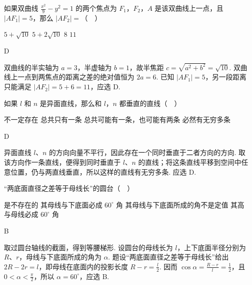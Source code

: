 \documentclass[UTF8,a4paper,oneside,11pt]{ctexbook}
\begin{document}
\begin{problem}
如果双曲线 \(\frac{x^2}{9}-y^2=1\) 的两个焦点为 \(F_1\)，\(F_2\)，\(A\) 是该双曲线上一点，且 \(\left| AF_1 \right|=5\)，那么 \(\left| AF_2 \right|=\)（\(\quad\)）

\choices
    {\(5+\sqrt{10}\)}
    {\(5+2\sqrt{10}\)}
    {\(8\)}
    {\(11\)}
\end{problem}

\begin{answer}
D
\end{answer}

\begin{solution}
双曲线的半实轴为 \(a=3\)，半虚轴为 \(b=1\)，故半焦距 \(c=\sqrt{a^2+b^2}=\sqrt{10}\). 双曲线上一点到两焦点的距离之差的绝对值恒为 \(2a=6\). 已知 \(\lvert AF_1\rvert=5\)，另一段距离只能满足 \(\lvert AF_2\rvert=5+6=11\)，应选 D.
\end{solution}

\begin{problem}
如果 \(l\) 和 \(n\) 是异面直线，那么和 \(l\)，\(n\) 都垂直的直线（\(\quad\)）

\choices
    {不一定存在}
    {总共只有一条}
    {总共可能有一条，也可能有两条}
    {必然有无穷多条}
\end{problem}

\begin{answer}
D
\end{answer}

\begin{solution}
异面直线 \(l\)、\(n\) 的方向向量不平行，因此存在一个同时垂直于二者方向的方向. 取该方向作一条直线，便得到同时垂直于 \(l\)、\(n\) 的直线；将这条直线平移到空间中任意位置，仍与两直线垂直，所以这样的直线有无穷多条. 应选 D.
\end{solution}

\begin{problem}
“两底面直径之差等于母线长”的圆台（\(\quad\)）

\choices
    {是不存在的}
    {其母线与下底面必成 \(60^\circ\) 角}
    {其母线与下底面所成的角不是定值}
    {其高与母线必成 \(60^\circ\) 角}
\end{problem}

\begin{answer}
B
\end{answer}

\begin{solution}
取过圆台轴线的截面，得到等腰梯形. 设圆台的母线长为 \(l\)，上下底面半径分别为 \(R\)、\(r\)，母线与下底面所成的角为 \(\alpha\). 题设“两底面直径之差等于母线长”给出 \(2R-2r=l\)，即母线在底面内的投影长度 \(R-r=\frac l2\). 因而
\(\cos\alpha=\frac{R-r}{l}=\frac12\)，且 \(0<\alpha<\frac\pi2\)，所以 \(\alpha=60^\circ\)，应选 B.
\end{solution}
\end{document}
